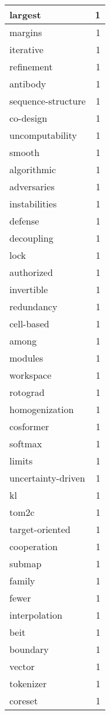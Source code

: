 \begin{table}[h]
\begin{tabular}{|l|r|}
largest & 1 \\
\hline
margins & 1 \\
\hline
iterative & 1 \\
\hline
refinement & 1 \\
\hline
antibody & 1 \\
\hline
sequence-structure & 1 \\
\hline
co-design & 1 \\
\hline
uncomputability & 1 \\
\hline
smooth & 1 \\
\hline
algorithmic & 1 \\
\hline
adversaries & 1 \\
\hline
instabilities & 1 \\
\hline
defense & 1 \\
\hline
decoupling & 1 \\
\hline
lock & 1 \\
\hline
authorized & 1 \\
\hline
invertible & 1 \\
\hline
redundancy & 1 \\
\hline
cell-based & 1 \\
\hline
among & 1 \\
\hline
modules & 1 \\
\hline
workspace & 1 \\
\hline
rotograd & 1 \\
\hline
homogenization & 1 \\
\hline
cosformer & 1 \\
\hline
softmax & 1 \\
\hline
limits & 1 \\
\hline
uncertainty-driven & 1 \\
\hline
kl & 1 \\
\hline
tom2c & 1 \\
\hline
target-oriented & 1 \\
\hline
cooperation & 1 \\
\hline
submap & 1 \\
\hline
family & 1 \\
\hline
fewer & 1 \\
\hline
interpolation & 1 \\
\hline
beit & 1 \\
\hline
boundary & 1 \\
\hline
vector & 1 \\
\hline
tokenizer & 1 \\
\hline
coreset & 1 \\

\end{tabular}
\end{table}
